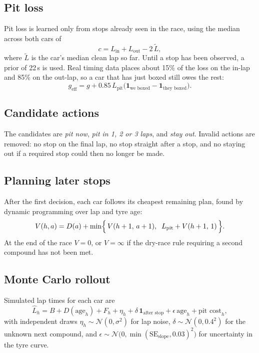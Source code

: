 \documentclass[11pt,a4paper]{article}
\newcommand{\Normal}{\mathcal{N}}
\begin{document}
\subsection{Pit loss}
Pit loss is learned only from stops already seen in the race, using the median across
both cars of
\begin{equation}
c = L_{\text{in}} + L_{\text{out}} - 2\,\tilde{L},
\end{equation}
where $\tilde{L}$ is the car's median clean lap so far. Until a stop has been observed, a
prior of 22\,s is used. Real timing data places about 15\% of the loss on the in-lap and
85\% on the out-lap, so a car that has just boxed still owes the rest:
\begin{equation}
g_{\text{eff}} = g + 0.85\,L_{\text{pit}}\bigl(\mathbf{1}_{\text{we boxed}}
 - \mathbf{1}_{\text{they boxed}}\bigr).
\end{equation}

\subsection{Candidate actions}
The candidates are \emph{pit now}, \emph{pit in 1, 2 or 3 laps}, and \emph{stay out}.
Invalid actions are removed: no stop on the final lap, no stop straight after a stop, and
no staying out if a required stop could then no longer be made.

\subsection{Planning later stops}
After the first decision, each car follows its cheapest remaining plan, found by dynamic
programming over lap and tyre age:
\begin{equation}
V(h,a) = D(a) + \min\Bigl\{\,V(h+1,\,a+1),\;\; L_{\text{pit}} + V(h+1,\,1)\,\Bigr\}.
\end{equation}
At the end of the race $V=0$, or $V=\infty$ if the dry-race rule requiring a second
compound has not been met.

\subsection{Monte Carlo rollout}
Simulated lap times for each car are
\begin{equation}
\hat{L}_h = B + D(\text{age}_h) + F_h + \eta_h + \delta\,\mathbf{1}_{\text{after stop}}
          + \epsilon\,\text{age}_h + \text{pit cost}_h,
\end{equation}
with independent draws
$\eta_h\sim\Normal(0,\sigma^2)$ for lap noise,
$\delta\sim\Normal(0,0.4^2)$ for the unknown next compound, and
$\epsilon\sim\Normal\bigl(0,\min(\mathrm{SE}_{\text{slope}},0.03)^2\bigr)$ for uncertainty in the
tyre curve.
\end{document}
